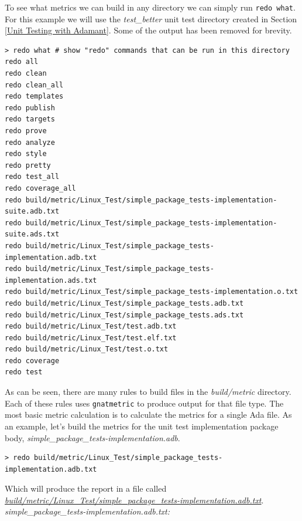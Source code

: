To see what metrics we can build in any directory we can simply run \texttt{redo what}. For this example we will use the \textit{test\_better} unit test directory created in Section \ref{Unit Testing with Adamant}. Some of the output has been removed for brevity.

\vspace{5mm} %
\begin{verbatim}
> redo what # show "redo" commands that can be run in this directory
redo all
redo clean
redo clean_all
redo templates
redo publish
redo targets
redo prove
redo analyze
redo style
redo pretty
redo test_all
redo coverage_all
redo build/metric/Linux_Test/simple_package_tests-implementation-suite.adb.txt
redo build/metric/Linux_Test/simple_package_tests-implementation-suite.ads.txt
redo build/metric/Linux_Test/simple_package_tests-implementation.adb.txt
redo build/metric/Linux_Test/simple_package_tests-implementation.ads.txt
redo build/metric/Linux_Test/simple_package_tests-implementation.o.txt
redo build/metric/Linux_Test/simple_package_tests.adb.txt
redo build/metric/Linux_Test/simple_package_tests.ads.txt
redo build/metric/Linux_Test/test.adb.txt
redo build/metric/Linux_Test/test.elf.txt
redo build/metric/Linux_Test/test.o.txt
redo coverage
redo test
\end{verbatim}
\vspace{5mm} %

As can be seen, there are many rules to build files in the \textit{build/metric} directory. Each of these rules uses \texttt{gnatmetric} to produce output for that file type. The most basic metric calculation is to calculate the metrics for a single Ada file. As an example, let's build the metrics for the unit test implementation package body, \textit{simple\_package\_tests-implementation.adb}.

\vspace{5mm} %
\begin{verbatim}
> redo build/metric/Linux_Test/simple_package_tests-implementation.adb.txt
\end{verbatim}
\vspace{5mm} %

Which will produce the report in a file called \textit{\url{build/metric/Linux\_Test/simple\_package\_tests-implementation.adb.txt}}. \\

\textit{simple\_package\_tests-implementation.adb.txt:}

